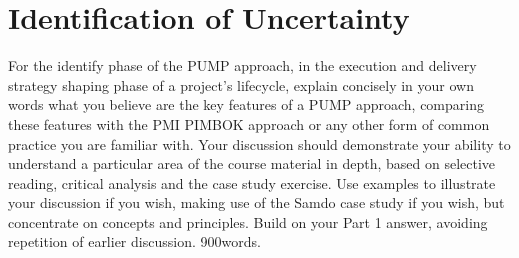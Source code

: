 
\section{Identification of Uncertainty} \label{s:Identify}
For the identify phase of the PUMP approach, in the execution and delivery strategy shaping phase of a project’s lifecycle, explain concisely in your own words what you believe are the key features of a PUMP approach, comparing these features with the PMI PIMBOK approach or any other form of common practice you are familiar with. Your discussion should demonstrate your ability to understand a particular area of the course material in depth, based on selective reading, critical analysis and the case study exercise. Use examples to illustrate your discussion if you wish, making use of the Samdo case study if you wish, but concentrate on concepts and principles. Build on your Part 1 answer, avoiding repetition of earlier discussion.
900words.
